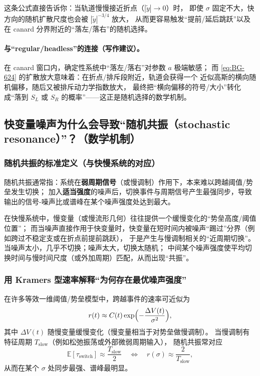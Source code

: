 这条公式直接告诉你：当轨道慢慢接近折点（$|\tilde y|\to0$）时，
即使 $\sigma$ 固定不大，快方向的随机扩散尺度也会被 $|\tilde y|^{-3/4}$ 放大，
从而更容易触发“提前/延后跳跃”以及在 canard 分界附近的“落左/落右”的随机选择。

\paragraph{与“regular/headless”的连接（写作建议）。}
在 canard 窗口内，确定性系统中“落左/落右”对参数 $a$ 极端敏感；
而 \eqref{eq:BG-624} 的扩散放大意味着：在折点/排斥段附近，轨道会获得一个
近似高斯的横向随机偏移，随后又被排斥动力学指数放大，
最终把“横向偏移的符号/大小”转化成“落到 $S_L$ 或 $S_R$ 的概率”——这正是随机选择的数学机制。

\subsection{快变量噪声为什么会导致“随机共振（stochastic resonance）”？（数学机制）}

\subsubsection{随机共振的标准定义（与快慢系统的对应）}
随机共振通常指：系统在\textbf{弱周期信号}（或慢调制）作用下，本来难以跨越阈值/势垒发生切换；
加入\textbf{适当强度}的噪声后，切换事件与周期信号产生最强同步，导致输出的信号-噪声比或谱峰在某个噪声强度处达到最大。

在快慢系统中，慢变量（或慢流形几何）往往提供一个缓慢变化的“势垒高度/阈值位置”；
而当噪声直接作用于快变量时，快变量在短时间内被噪声“踢过”分界（例如跨过不稳定支或在折点前提前跳跃），
于是产生与慢调制相关的“近周期切换”。当噪声太小，几乎不切换；噪声太大，切换太随机；
中间某个噪声强度使平均切换时间与慢时间尺度（或外加周期）匹配，从而出现“共振”。

\subsubsection{用 Kramers 型速率解释“为何存在最优噪声强度”}
在许多等效一维阈值/势垒模型中，跨越事件的速率可近似为
\[
r(t)\approx C(t)\exp\Bigl(-\frac{\Delta V(t)}{\sigma^2}\Bigr),
\]
其中 $\Delta V(t)$ 随慢变量缓慢变化（慢变量相当于对势垒做慢调制）。
当慢调制有特征周期 $T_{\mathrm{slow}}$（例如松弛振荡或外部微弱周期输入），
随机共振常对应
\[
\mathbb E[\tau_{\mathrm{switch}}]\approx \frac{T_{\mathrm{slow}}}{2}
\quad\Longleftrightarrow\quad
r(\sigma)\approx \frac{2}{T_{\mathrm{slow}}},
\]
从而在某个 $\sigma$ 处同步最强、谱峰最明显。

